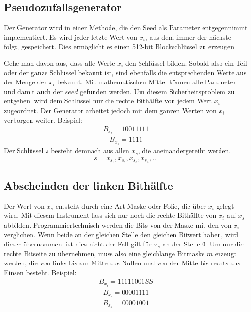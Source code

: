\documentclass[10pt,a4paper]{article}
\begin{document}
\subsection{Pseudozufallsgenerator}

Der Generator wird in einer Methode, die den Seed als Parameter entgegennimmt implementiert.
Es wird jeder letzte Wert von $x_i$, aus dem immer der nächste folgt, gespeichert.
Dies ermöglicht es einen 512-bit Blockschlüssel zu erzeugen.

Gehe man davon aus, dass alle Werte $x_i$ den Schlüssel bilden. Sobald also ein Teil oder der ganze Schlüssel bekannt ist, sind ebenfalls die entsprechenden Werte aus der Menge der $x_i$ bekannt. Mit mathematischen Mittel können alle Parameter und damit auch der $seed$ gefunden werden.
Um diesem Sicherheitsproblem zu entgehen, wird dem Schlüssel nur die rechte Bithälfte von jedem Wert $x_i$ zugeordnet.
Der Generator arbeitet jedoch mit dem ganzen Werten von $x_i$ verborgen weiter.
Beispiel:
\begin{align*}
    B_{x_i} = 1001 1111
\end{align*}
\begin{align*}
    B_{x_s} = 1111
\end{align*}
Der Schlüssel $s$ besteht demnach aus allen $x_s$, die aneinandergereiht werden.
\begin{align*}
    s = x_{s_1}, x_{s_2}, x_{s_3}, x_{s_4}, ...
\end{align*}

\subsection{Abscheinden der linken Bithälfte}

Der Wert von $x_s$ entsteht durch eine Art Maske oder Folie, die über $x_i$ gelegt wird.
Mit diesem Instrument lass sich nur noch die rechte Bithälfte von $x_i$ auf $x_s$ abbilden.
Programmiertechnisch werden die Bits von der Maske mit den von $x_i$ verglichen.
Wenn beide an der gleichen Stelle den gleichen Bitwert haben, wird dieser übernommen, ist dies nicht der Fall gilt für $x_s$ an der Stelle 0.
Um nur die rechte Bitseite zu übernehmen, muss also eine gleichlange Bitmaske $m$ erzeugt werden, die von links bis zur Mitte aus Nullen und von der Mitte bis rechts aus Einsen besteht.
Beispiel:
\begin{align*}
    B_{x_i} = 1111 1001SS
\end{align*}
\begin{align*}
    B_{x_i} = 0000 1111
\end{align*}
\begin{align*}
    B_{x_s} = 0000 1001
\end{align*}
\end{document}
